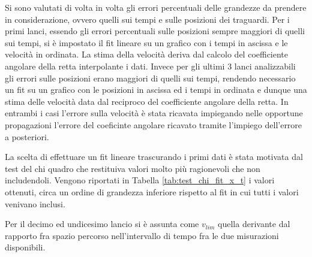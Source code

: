 \documentclass[a4paper,11pt,oneside]{article}
\begin{document}
Si sono valutati di volta in volta gli errori percentuali delle grandezze da prendere in considerazione, ovvero quelli sui tempi e sulle posizioni dei traguardi.
Per i primi lanci, essendo gli errori percentuali sulle posizioni sempre maggiori di quelli sui tempi, si è impostato il fit lineare su un grafico con i tempi in ascissa e le velocità in ordinata. La stima della velocità deriva dal calcolo del coefficiente angolare della retta interpolante i dati. Invece per gli ultimi 3 lanci analizzabili gli errori sulle posizioni erano maggiori di quelli sui tempi, rendendo necessario un fit su un grafico con le posizioni in ascissa ed i tempi in ordinata e dunque una stima delle velocità data dal reciproco del coefficiente angolare della retta. In entrambi i casi l'errore sulla velocità è stata ricavata impiegando nelle opportune propagazioni l'errore del coeficinte angolare ricavato tramite l'impiego dell'errore a posteriori.  

La scelta di effettuare un fit lineare trascurando i primi dati è stata motivata dal test del chi quadro che restituiva valori molto più ragionevoli che non includendoli. Vengono riportati in Tabella \ref{tab:test_chi_fit_x_t} i valori ottenuti, circa un ordine di grandezza inferiore rispetto al fit in cui tutti i valori venivano inclusi.


Per il decimo ed undicesimo lancio si è assunta come $v_{lim}$ quella derivante dal rapporto fra spazio percorso nell'intervallo di tempo fra le due misurazioni disponibili. 

\end{document}
